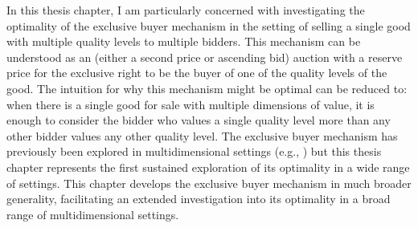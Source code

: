 In this thesis chapter, I am particularly concerned with investigating the optimality of the exclusive buyer mechanism in the setting of selling a single good with multiple quality levels to multiple bidders. This mechanism can be understood as an (either a second price or ascending bid) auction with a reserve price for the exclusive right to be the buyer of one of the quality levels of the good. The intuition for why this mechanism might be optimal can be reduced to: when there is a single good for sale with multiple dimensions of value, it is enough to consider the bidder who values a single quality level more than any other bidder values any other quality level. The exclusive buyer mechanism has previously been explored in multidimensional settings (e.g., \cite{brusco2011, belloni2010multidimensional}) but this thesis chapter represents the first sustained exploration of its optimality in a wide range of settings. This chapter develops the exclusive buyer mechanism in much broader generality, facilitating an extended investigation into its optimality in a broad range of multidimensional settings. 
 


